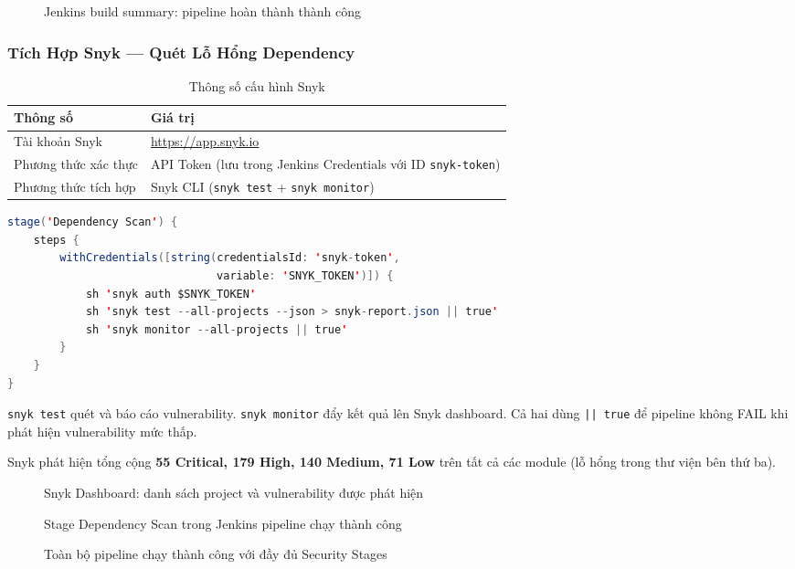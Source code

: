 \begin{figure}[H]
\centering
{}
\caption{Jenkins build summary: pipeline hoàn thành thành công}
\end{figure}

\subsubsection{Tích Hợp Snyk --- Quét Lỗ Hổng Dependency}

\begin{table}[H]
\centering
\caption{Thông số cấu hình Snyk}
\begin{tabular}{|l|p{9cm}|}
\hline
\textbf{Thông số} & \textbf{Giá trị} \\
\hline
Tài khoản Snyk & \url{https://app.snyk.io} \\
\hline
Phương thức xác thực & API Token (lưu trong Jenkins Credentials với ID \texttt{snyk-token}) \\
\hline
Phương thức tích hợp & Snyk CLI (\texttt{snyk test} + \texttt{snyk monitor}) \\
\hline
\end{tabular}
\end{table}

\begin{lstlisting}[language=Java, caption={Stage Dependency Scan trong Jenkinsfile}]
stage('Dependency Scan') {
    steps {
        withCredentials([string(credentialsId: 'snyk-token',
                                variable: 'SNYK_TOKEN')]) {
            sh 'snyk auth $SNYK_TOKEN'
            sh 'snyk test --all-projects --json > snyk-report.json || true'
            sh 'snyk monitor --all-projects || true'
        }
    }
}
\end{lstlisting}

\texttt{snyk test} quét và báo cáo vulnerability. \texttt{snyk monitor} đẩy kết quả lên Snyk dashboard. Cả hai dùng \texttt{|| true} để pipeline không FAIL khi phát hiện vulnerability mức thấp.

Snyk phát hiện tổng cộng \textbf{55 Critical, 179 High, 140 Medium, 71 Low} trên tất cả các module (lỗ hổng trong thư viện bên thứ ba).

\begin{figure}[H]
\centering
{}
\caption{Snyk Dashboard: danh sách project và vulnerability được phát hiện}
\end{figure}

\begin{figure}[H]
\centering
{}
\caption{Stage Dependency Scan trong Jenkins pipeline chạy thành công}
\end{figure}

\begin{figure}[H]
\centering
{}
\caption{Toàn bộ pipeline chạy thành công với đầy đủ Security Stages}
\end{figure}

